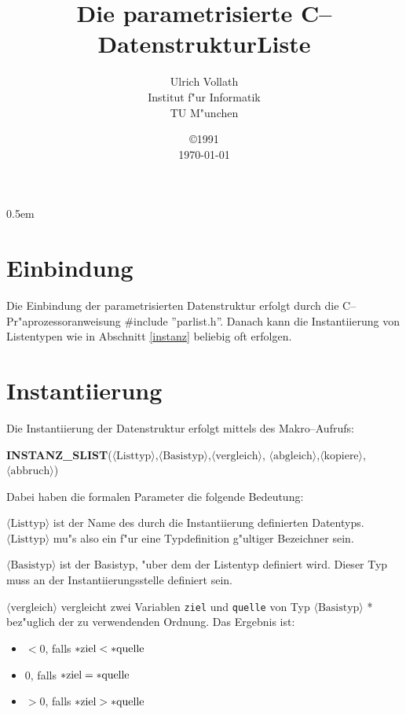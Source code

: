 \parindent0pt
\parskip0.5em
\newcommand{\fp}[1]{{\em$\langle\mbox{#1}\rangle$}}
\newcommand{\var}[1]{{\tt\mbox{#1}}}
\newcommand{\mac}[1]{{\bf\mbox{#1}}}



\begin{titlepage}
\title{Die parametrisierte C--DatenstrukturListe}
\author{Ulrich Vollath\\Institut f"ur Informatik\\TU M"unchen}
\date{\copyright 1991\\\today}
\end{titlepage}
\maketitle

\section{Einbindung}
Die Einbindung der parametrisierten Datenstruktur erfolgt durch
die C--Pr"aprozessoranweisung \#include ''parlist.h''.
Danach kann die Instantiierung von Listentypen 
wie in Abschnitt \ref{instanz} beliebig
oft erfolgen.

\section{\label{instanz}Instantiierung}
Die Instantiierung der Datenstruktur erfolgt mittels des Makro--Aufrufs:

\mac{INSTANZ\_SLIST}(\fp{Listtyp},\fp{Basistyp},\fp{vergleich},
\fp{abgleich},\fp{kopiere},\fp{abbruch})

Dabei haben die formalen Parameter die folgende Bedeutung:

\fp{Listtyp} ist der Name des durch die Instantiierung definierten Datentyps.
\fp{Listtyp} mu"s also ein f"ur eine Typdefinition g"ultiger Bezeichner sein.

\fp{Basistyp} ist der Basistyp, "uber dem der Listentyp definiert wird. Dieser 
Typ muss an der Instantiierungsstelle definiert sein.


\fp{vergleich} vergleicht zwei Variablen \var{ziel} und 
\var{quelle} von Typ \fp{Basistyp} * bez"uglich der zu verwendenden Ordnung.
Das Ergebnis ist:
\begin{itemize}
\item $< 0$, falls $*\var{ziel} < *\var{quelle}$
\item $0$,  falls $*\var{ziel} = *\var{quelle}$
\item $> 0$, falls $*\var{ziel} > *\var{quelle}$
\end{itemize}

